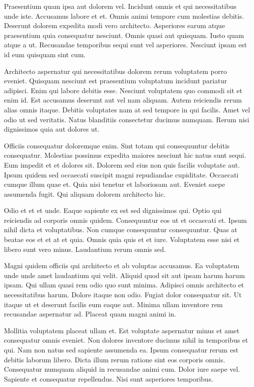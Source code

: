 Praesentium quam ipsa aut dolorem vel. Incidunt omnis et qui necessitatibus unde iste. Accusamus labore et et. Omnis animi tempore cum molestias debitis. Deserunt dolorem expedita modi vero architecto. Asperiores earum atque praesentium quia consequatur nesciunt. Omnis quasi aut quisquam. Iusto quam atque a ut. Recusandae temporibus sequi sunt vel asperiores. Nesciunt ipsam est id eum quisquam sint cum.

Architecto aspernatur qui necessitatibus dolorem rerum voluptatem porro eveniet. Quisquam nesciunt est praesentium voluptatum incidunt pariatur adipisci. Enim qui labore debitis esse. Nesciunt voluptatem quo commodi sit et enim id. Est accusamus deserunt aut vel nam aliquam. Autem reiciendis rerum alias omnis itaque. Debitis voluptates nam at sed tempore in qui facilis. Amet vel odio ut sed veritatis. Natus blanditiis consectetur ducimus numquam. Rerum nisi dignissimos quia aut dolores ut.

Officiis consequatur doloremque enim. Sint totam qui consequuntur debitis consequatur. Molestias possimus expedita maiores nesciunt hic natus sunt sequi. Eum impedit et et dolores sit. Dolorem sed eius non quis facilis voluptate aut. Ipsum quidem sed occaecati suscipit magni repudiandae cupiditate. Occaecati cumque illum quae et. Quia nisi tenetur et laboriosam aut. Eveniet saepe assumenda fugit. Qui aliquam dolorem architecto hic.

Odio et et et unde. Eaque sapiente ex est sed dignissimos qui. Optio qui reiciendis ad corporis omnis quidem. Consequuntur eos ut et occaecati et. Ipsum nihil dicta et voluptatibus. Non cumque consequuntur consequuntur. Quas at beatae eos et et at et quia. Omnis quia quis et et iure. Voluptatem esse nisi et libero sunt vero minus. Laudantium rerum omnis sed.

Magni quidem officiis qui architecto et ab voluptas accusamus. Ea voluptatem unde unde amet laudantium qui velit. Aliquid quod sit aut ipsam harum harum ipsam. Qui ullam quasi rem odio quo sunt minima. Adipisci omnis architecto et necessitatibus harum. Dolore itaque non odio. Fugiat dolor consequatur sit. Ut itaque ut et deserunt facilis eum eaque aut. Minima ullam inventore rem recusandae aspernatur ad. Placeat quam magni animi in.

Mollitia voluptatem placeat ullam et. Est voluptate aspernatur minus et amet consequatur omnis eveniet. Non dolores inventore ducimus nihil in temporibus et qui. Nam non natus sed sapiente assumenda ea. Ipsum consequatur rerum est debitis laborum libero. Dicta illum rerum ratione sint eos corporis omnis. Consequatur numquam aliquid in recusandae animi cum. Dolor iure saepe vel. Sapiente et consequatur repellendus. Nisi sunt asperiores temporibus.

